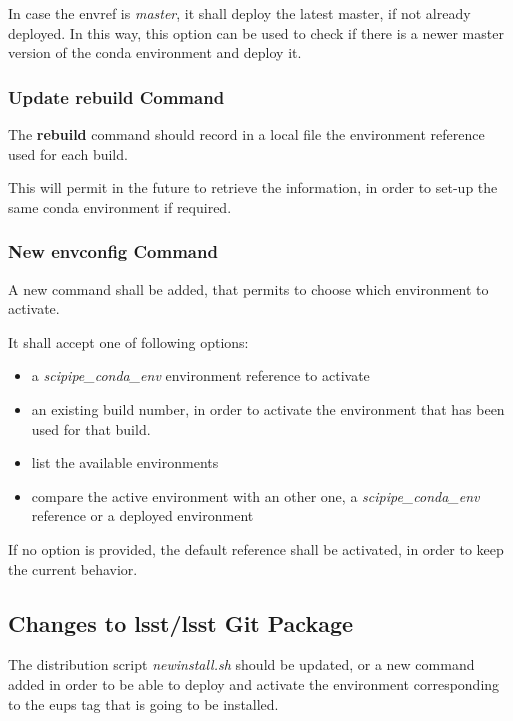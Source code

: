 In case the envref is \textit{master}, it shall deploy the latest master, if not already deployed.
In this way, this option can be used to check if there is a newer master version of the conda environment and deploy it.


\subsubsection{Update rebuild Command} \label{sec:rebuild}

The \textbf{rebuild} command should record in a local file the environment reference used for each build.

This will permit in the future to retrieve the information, in order to set-up the same conda environment if required.


\subsubsection{New envconfig Command} \label{sec:envconfig}

A new command shall be added, that permits to choose which environment to activate.

It shall accept one of following options:

\begin{itemize}
\item a \textit{scipipe\_conda\_env} environment reference to activate
\item an existing build number, in order to activate the environment that has been used for that build.
\item list the available environments
\item compare the active environment with an other one, a \textit{scipipe\_conda\_env} reference or a deployed environment
\end{itemize}

If no option is provided, the default reference shall be activated, in order to keep the current behavior.


\subsection{Changes to lsst/lsst Git Package} \label{sec:newinstall}

The distribution script \textit{newinstall.sh} should be updated, or a new command added in order to be able to deploy and activate the environment corresponding to the eups tag that is going to be installed.

